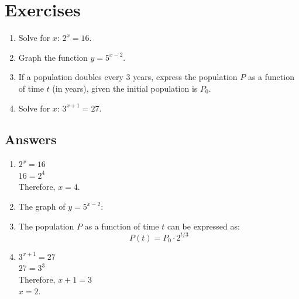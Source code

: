 \documentclass{article}
\begin{document}
\newpage

\section*{Exercises}
\begin{enumerate}
    \item Solve for \(x\): \(2^x = 16\).
    \item Graph the function \(y = 5^{x-2}\).
    \item If a population doubles every 3 years, express the population \(P\) as a function of time \(t\) (in years), given the initial population is \(P_0\).
    \item Solve for \(x\): \(3^{x+1} = 27\).
\end{enumerate}

\subsection*{Answers}

\begin{enumerate}
    \item \(2^x = 16\)\\
    \(16 = 2^4\)\\
    Therefore, \(x = 4\).
    \item The graph of \(y = 5^{x-2}\):
    \begin{center}
    \end{center}
    \item The population \(P\) as a function of time \(t\) can be expressed as:
    \[
    P(t) = P_0 \cdot 2^{t/3}
    \]
    \item \(3^{x+1} = 27\)\\
    \(27 = 3^3\)\\
    Therefore, \(x + 1 = 3\)\\
    \(x = 2\).
\end{enumerate}
\end{document}
